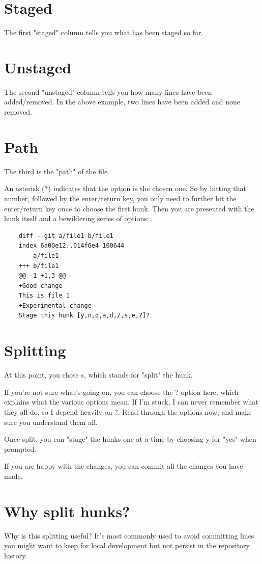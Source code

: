 \documentclass{report}
\begin{document}
\section{Staged}
The first "staged" column tells you what has been staged so far.

\section{Unstaged}
The second "unstaged" column tells you how many lines have been added/removed. In the above example, two lines have been added and none removed.

\section{Path}
The third is the "path" of the file.

An asterisk (*) indicates that the option is the chosen one. So by hitting that number, followed by the enter/return key, you only need to further hit the enter/return key once to choose the first hunk. Then you are presented with the hunk itself and a bewildering series of options:

\begin{lstlisting}
    diff --git a/file1 b/file1
    index 6a00e12..014f6e4 100644
    --- a/file1
    +++ b/file1
    @@ -1 +1,3 @@
    +Good change
    This is file 1
    +Experimental change
    Stage this hunk [y,n,q,a,d,/,s,e,?]?
\end{lstlisting}

\section{Splitting}
At this point, you chose s, which stands for "split" the hunk.

If you're not sure what's going on, you can choose the ? option here, which explains what the various options mean. If I'm stuck, I can never remember what they all do, so I depend heavily on ?. Read through the options now, and make sure you understand them all.

Once split, you can "stage" the hunks one at a time by choosing y for "yes" when prompted.

If you are happy with the changes, you can commit all the changes you have made.

\section{Why split hunks?}
Why is this splitting useful? It's most commonly used to avoid committing lines you might want to keep for local development but not persist in the repository history.
\end{document}
